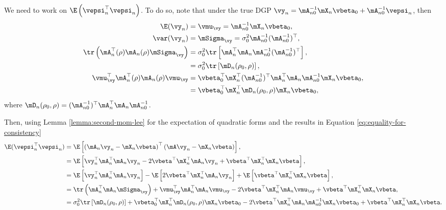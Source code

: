 \documentclass[english,12pt]{book}\usepackage[]{graphicx}\usepackage[]{xcolor}
\begin{document}
\begin{subappendices}
We need to work on $\E\left(\vepsi_n^\top\vepsi_n\right)$. To do so, note that under the true DGP $\vy_n = \mA_{n0}^{-1}\mX_n\vbeta_0 + \mA_{n0}^{-1}\vepsi_n$, then
\begin{equation}\label{eq:equality-for-consistency}
\begin{aligned}
\E(\vy_n) & = \vmu_{\vy}     = \mA_{n0}^{-1}\mX_n\vbeta_0, \\
\var(\vy_n)& = \mSigma_{\vy}  = \sigma_0^2\mA_{n0}^{-1}(\mA_{n0}^{-1})^\top, \\
\tr\left(\mA_n^\top(\rho)\mA_n(\rho)\mSigma_{\vy}\right) & = \sigma_0^2\tr\left[\mA_n^\top\mA_n\mA_{n0}^{-1}(\mA_{n0}^{-1})^\top\right], \\
& = \sigma_0^2\tr\left[\mD_n(\rho_0, \rho)\right], \\
\vmu_{\vy}^\top\mA_n^\top(\rho)\mA_n(\rho)\vmu_{\vy} & = \vbeta_0^\top\mX_n^\top(\mA_{n0}^{-1})^\top\mA_n^\top\mA_n\mA_{n0}^{-1}\mX_n\vbeta_0, \\
& = \vbeta_0^\top\mX_n^\top\mD_n(\rho_0, \rho)\mX_n\vbeta_0,
\end{aligned}
\end{equation}
%
where $\mD_n(\rho_0, \rho) = (\mA_{n0}^{-1})^\top\mA_n^\top\mA_n\mA_{n0}^{-1}$.

Then, using Lemma \ref{lemma:second-mom-lee} for the expectation of quadratic forms and the results in Equation \eqref{eq:equality-for-consistency}
\begin{equation*}
\begin{aligned}
\E(\vepsi_n^\top\vepsi_n) & = \E\left[\left(\mA_n\vy_n - \mX_n\vbeta\right)^\top\left(\mA\vy_n - \mX_n\vbeta\right)\right], \\
& = \E\left[\vy_n^\top\mA_n^\top\mA_n\vy_n - 2\vbeta^\top\mX_n^\top\mA_n\vy_n + \vbeta^\top\mX_n^\top\mX_n\vbeta\right], \\
& = \E\left[\vy_n^\top\mA_n^\top\mA_n\vy_n \right]- \E\left[2\vbeta^\top\mX_n^\top\mA_n\vy_n\right] + \E\left[\vbeta^\top\mX_n^\top\mX_n\vbeta\right], \\
& = \tr\left(\mA_n^\top\mA_n\mSigma_{\vy}\right) + \vmu_{\vy}^\top\mA_n^\top\mA_n\vmu_{\vy} - 2\vbeta^\top\mX_n^\top\mA_n\vmu_{\vy} + \vbeta^\top\mX_n^\top\mX_n\vbeta, \\
& = \sigma_0^2\tr\left[\mD_n(\rho_0, \rho)\right] + \vbeta_0^\top\mX_n^\top\mD_n(\rho_0, \rho)\mX_n\vbeta_0 -2\vbeta^\top\mX_n^\top\mA_n\mA_{n0}^{-1}\mX_n\vbeta_0 + \vbeta^\top\mX_n^\top\mX_n\vbeta.
\end{aligned}
\end{equation*}


\end{subappendices}
\end{document}
